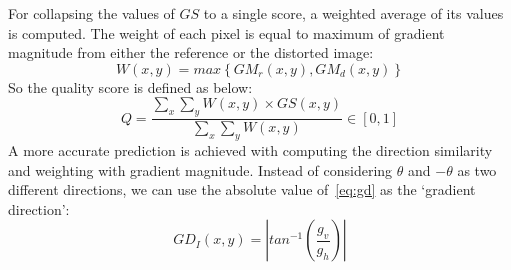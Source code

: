 For collapsing the values of $GS$ to a single score, a weighted average of its values is computed. The weight of each pixel is equal to maximum of gradient magnitude from either the reference or the distorted image:
\begin{equation}
    W(x, y) = max\left\{ GM_r(x, y), GM_d(x, y)\right\}
    \label{eq:weight_gs}
\end{equation}
So the quality score is defined as below:
\begin{equation}
    Q = \frac{\sum_x\sum_y W(x, y)\times GS(x, y)}{\sum_x\sum_y W(x, y)} \in [0, 1]
    \label{eq:frscore}
\end{equation}
A more accurate prediction is achieved with computing the direction similarity and weighting with gradient magnitude. Instead of considering $\theta$ and $-\theta$ as two different directions, we can use the absolute value of~\ref{eq:gd} as the `gradient direction':
\begin{equation}
    GD_I(x, y) = \left|tan^{-1}\left(\frac{g_v}{g_h}\right)\right|
    \label{eq:absdir}
\end{equation}

